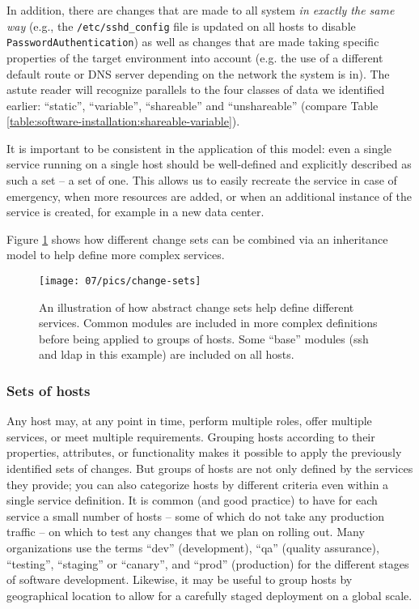 In addition, there are changes that are made to all
system {\em in exactly the same way} (e.g., the
{\tt /etc/sshd\_config} file is updated on all hosts to
disable {\tt PasswordAuthentication}) as well as
changes that are made taking specific properties of
the target environment into account (e.g. the use of a
different default route or DNS server depending on the
network the system is in).  The astute reader will
recognize parallels to the four classes of data we
identified earlier: ``static'', ``variable'',
``shareable'' and ``unshareable'' (compare Table
\ref{table:software-installation:shareable-variable}).

It is important to be consistent in the application of
this model:  even a single service running on a single
host should be well-defined and explicitly described
as such a set -- a set of one.  This allows us to
easily recreate the service in case of emergency, when
more resources are added, or when an additional
instance of the service is created, for example in a
new data center.

Figure
\ref{fig:configuration-management:change-states} shows
how different change sets can be combined via an
inheritance model to help define more complex
services.

\begin{figure}[!ht]
	\centering
	\texttt{[image: 07/pics/change-sets]}
		\caption[Sets of changes applied to sets of hosts]{
			An illustration of how abstract
			change sets help define different services. Common
			modules are included in more complex definitions
			before being applied to groups of hosts.  Some
			``base'' modules (ssh and ldap in this example)
			are included on all hosts.
			\label{fig:configuration-management:change-states}}
\end{figure}

\subsubsection*{Sets of hosts}

Any host may, at any point in time, perform multiple
roles, offer multiple services, or meet multiple
requirements.  Grouping hosts according to their
properties, attributes, or functionality makes it
possible to apply the previously identified sets of
changes.  But groups of hosts are not only defined by
the services they provide; you can also categorize
hosts by different criteria even within a single
service definition.  It is common (and good practice)
to have for each service a small number of hosts --
some of which do not take any production traffic -- on
which to test any changes that we plan on rolling out.
Many organizations use the terms ``dev''
(development), ``qa'' (quality assurance),
``testing'', ``staging'' or ``canary'', and ``prod''
(production) for the different stages of software
development.  Likewise, it may be useful to group
hosts by geographical location to allow for a
carefully staged deployment on a global scale.

